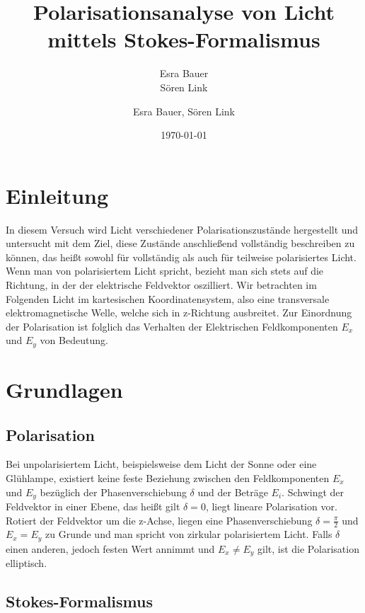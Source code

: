 \documentclass[bigchapter,colorback,accentcolor=tud4b,linedtoc,11pt]{tudreport}
\title{Polarisationsanalyse von Licht mittels Stokes-Formalismus}
\subtitle{Esra Bauer  \\Sören Link}
\author{Esra Bauer, Sören Link}
\date{\today}
\begin{document}

\maketitle

\tableofcontents


\chapter{Einleitung}

In diesem Versuch wird Licht verschiedener Polarisationszustände hergestellt und untersucht mit dem Ziel, diese Zustände anschließend vollständig beschreiben zu können, das heißt sowohl für vollständig als auch für teilweise polarisiertes Licht. Wenn man von polarisiertem Licht spricht, bezieht man sich stets auf die Richtung, in der der elektrische Feldvektor oszilliert. Wir betrachten im Folgenden Licht im kartesischen Koordinatensystem, also eine transversale elektromagnetische Welle, welche sich in z-Richtung ausbreitet. Zur Einordnung der Polarisation ist folglich das Verhalten der Elektrischen Feldkomponenten $E_x$ und $E_y$ von Bedeutung.

\chapter{Grundlagen}
\section{Polarisation}

Bei unpolarisiertem Licht, beispielsweise dem Licht der Sonne oder eine Glühlampe, existiert keine feste Beziehung zwischen den Feldkomponenten $E_x$ und $E_y$ bezüglich der Phasenverschiebung $\delta$ und der Beträge $E_{i}$. Schwingt der Feldvektor in einer Ebene, das heißt gilt $\delta=0$, liegt lineare Polarisation vor. Rotiert der Feldvektor um die z-Achse, liegen eine Phasenverschiebung $\delta=\frac{\pi}{2}$ und $E_{x}=E_{y}$ zu Grunde und man spricht von zirkular polarisiertem Licht. Falls $\delta$ einen anderen, jedoch festen Wert annimmt und $E_{x}\neq E_{y}$ gilt, ist die Polarisation elliptisch. 


\section{Stokes-Formalismus}
\end{document}
